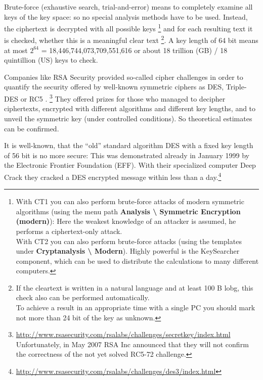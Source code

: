 Brute-force (exhaustive search, trial-and-error) means to completely examine all keys of the key space: so no special analysis methods have to be used. Instead, the ciphertext is decrypted with all possible keys%
\footnote{%
    With CT1 you can also perform brute-force attacks
    of modern symmetric algorithms (using the menu path
    {\bf Analysis \textbackslash{} Symmetric Encryption (modern)}): Here
    the weakest knowledge of an attacker is assumed, he performs a 
    ciphertext-only attack.\\
    With CT2 you can also perform brute-force attacks
    (using the templates under {\bf Cryptanalysis \textbackslash{} Modern}).
    Highly powerful is the KeySearcher component, which can be used to
    distribute the calculations to many different computers.
}
and for each resulting text it is checked, whether this is a meaningful clear text%
\footnote{%
    If the cleartext is written in a natural language and at least 100 B
    lobg, this check also can be performed automatically.\\
    To achieve a result in an appropriate time with a single PC you should 
    mark not more than 24 bit of the key as unknown.
}.
A key length of 64 bit means at most $2^{64}$ = 18,446,744,073,709,551,616 or about 18 trillion (GB) / 18 quintillion (US)  keys to check.

Companies like RSA Security provided so-called cipher challenges in order
to quantify the security offered by well-known symmetric ciphers as DES,
Triple-DES or RC5%
.%
\footnote{%
 \url{http://www.rsasecurity.com/rsalabs/challenges/secretkey/index.html}\\
 Unfortunately, in May 2007 RSA Inc announced that they will not confirm the
 correctness of the not yet solved RC5-72 challenge.}
They offered prizes for those who managed to decipher ciphertexts, encrypted with different algorithms and different key lengths, and to unveil the symmetric key (under controlled conditions). So theoretical estimates can be confirmed.

It is well-known, that the ``old'' standard algorithm DES with a fixed key
length of 56 bit is no more secure: This was demonstrated already in January
1999 by the Electronic Frontier Foundation (EFF). With their specialized
computer Deep Crack they cracked a DES encrypted message within less than a
day.\footnote{%
 \url{http://www.rsasecurity.com/rsalabs/challenges/des3/index.html}
}

